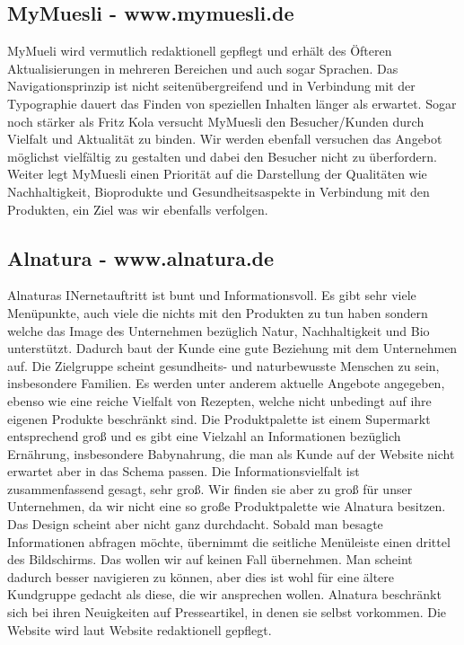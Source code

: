 \documentclass[12pt,a4paper,oneside,ngerman]{article}
\begin{document}
\subsection{MyMuesli - www.mymuesli.de} %
MyMueli wird vermutlich redaktionell gepflegt und erhält des Öfteren Aktualisierungen in mehreren Bereichen und auch sogar Sprachen. 
Das Navigationsprinzip ist nicht seitenübergreifend und in Verbindung mit der Typographie dauert das Finden von speziellen Inhalten länger als erwartet.
Sogar noch stärker als Fritz Kola versucht MyMuesli den Besucher/Kunden durch Vielfalt und Aktualität zu binden.
Wir werden ebenfall versuchen das Angebot möglichst vielfältig zu gestalten und dabei den Besucher nicht zu überfordern.
Weiter legt MyMuesli einen Priorität auf die Darstellung der Qualitäten wie Nachhaltigkeit, Bioprodukte und Gesundheitsaspekte in Verbindung mit den Produkten, ein Ziel was wir ebenfalls verfolgen.

\subsection{Alnatura - www.alnatura.de} %
Alnaturas INernetauftritt ist bunt und Informationsvoll. Es gibt sehr viele Menüpunkte, auch viele die nichts mit den Produkten zu tun haben sondern welche das Image des Unternehmen bezüglich Natur, Nachhaltigkeit und Bio unterstützt. Dadurch baut der Kunde eine gute Beziehung mit dem Unternehmen auf. Die Zielgruppe scheint gesundheits- und naturbewusste Menschen zu sein, insbesondere Familien. Es werden unter anderem aktuelle Angebote angegeben, ebenso wie eine reiche Vielfalt von Rezepten, welche nicht unbedingt auf ihre eigenen Produkte beschränkt sind. Die Produktpalette ist einem Supermarkt entsprechend groß und es gibt eine Vielzahl an Informationen bezüglich Ernährung, insbesondere Babynahrung, die man als Kunde auf der Website nicht erwartet aber in das Schema passen. Die Informationsvielfalt ist zusammenfassend gesagt, sehr groß. Wir finden sie aber zu groß für unser Unternehmen, da wir nicht eine so große Produktpalette wie Alnatura besitzen. Das Design scheint aber nicht ganz durchdacht. Sobald man besagte Informationen abfragen möchte, übernimmt die seitliche Menüleiste einen drittel des Bildschirms. Das wollen wir auf keinen Fall übernehmen. Man scheint dadurch besser navigieren zu können, aber dies ist wohl für eine ältere Kundgruppe gedacht als diese, die wir ansprechen wollen. Alnatura beschränkt sich bei ihren Neuigkeiten auf Presseartikel, in denen sie selbst vorkommen. Die Website wird laut Website redaktionell gepflegt.
\end{document}

